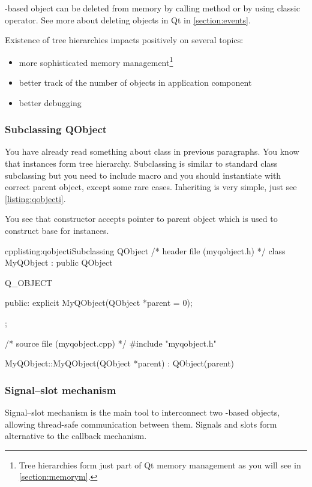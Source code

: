 \indent{}-based object can be deleted from memory by calling method or by using classic operator. See more about deleting objects in Qt in \autoref{section:events}.

Existence of tree hierarchies impacts positively on several topics:
\begin{itemize}
\item more sophisticated memory management\footnote{Tree hierarchies form just part of Qt memory management as you will see in \autoref{section:memorym}.}
\item better track of the number of objects in application component
\item better debugging
\end{itemize}

\subsubsection{Subclassing QObject}
You have already read something about class in previous paragraphs. You know that instances form tree hierarchy. Subclassing is similar to standard \cpp class subclassing but you need to include macro and you should instantiate with correct parent object, except some rare cases. Inheriting is very simple, just see \autoref{listing:qobjecti}.

You see that constructor accepts pointer to parent object which is used to construct base for instances.

\begin{fdoccode}{cpp}{listing:qobjecti}{Subclassing QObject}
/* header file (myqobject.h) */
class MyQObject : public QObject {
	Q_OBJECT
	
    public:
		explicit MyQObject(QObject *parent = 0);
};

/* source file (myqobject.cpp) */
#include "myqobject.h"


MyQObject::MyQObject(QObject *parent) : QObject(parent) {
}
\end{fdoccode}

\subsubsection{Signal--slot mechanism}
Signal--slot mechanism is the main tool to interconnect two -based objects, allowing thread-safe communication between them. Signals and slots form alternative to the callback mechanism. 

